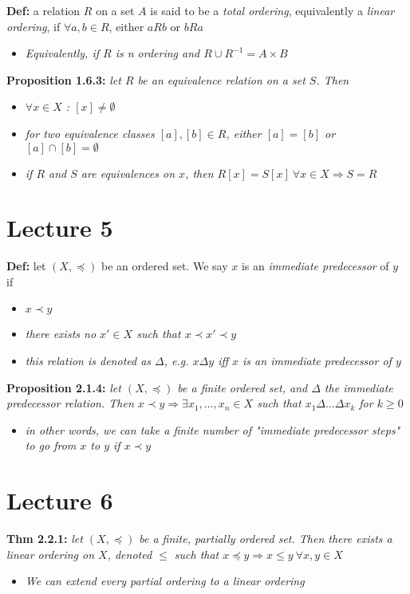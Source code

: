 \documentclass[12pt]{article}
\begin{document}
\textbf{Def: }a relation $R$ on a set $A$ is said to be a \emph{total ordering}, equivalently a \emph{linear ordering}, if $\forall a, b \in R$, either $aRb$ or $bRa$
\begin{itemize}
    \item \emph{Equivalently, if $R$ is n ordering and $R \cup R^{-1} = A \times B$}
\end{itemize}

\textbf{Proposition 1.6.3: }\emph{let $R$ be an equivalence relation on a set $S$. Then}
\begin{itemize}
    \item \emph{$\forall x \in X$ : $[x] \neq \emptyset$}
    \item \emph{for two equivalence classes $[a], [b] \in R$, either $[a] = [b]$ or $[a] \cap [b] = \emptyset$}
    \item \emph{if $R$ and $S$ are equivalences on $x$, then $R[x] = S[x]\ \forall x \in X \Rightarrow S = R$}
\end{itemize}
\clearpage

\section{Lecture 5}
\textbf{Def: }let $(X, \preceq)$ be an ordered set. We say $x$ is an \emph{immediate predecessor} of $y$ if
\begin{itemize}
    \item \emph{$x \prec y$}
    \item \emph{there exists no $x' \in X$ such that $x \prec x' \prec y$}
    \item \emph{this relation is denoted as $\Delta$, e.g. $x\Delta y$ iff $x$ is an immediate predecessor of $y$}
\end{itemize}

\textbf{Proposition 2.1.4: }\emph{let $(X, \preceq)$ be a finite ordered set, and $\Delta$ the immediate predecessor relation. Then $x \prec y \Rightarrow \exists x_1, \dots, x_n \in X$ such that $x_1 \Delta \dots \Delta x_k$ for $k \geq 0$}
\begin{itemize}
    \item \emph{in other words, we can take a finite number of "immediate predecessor steps" to go from $x$ to $y$ if $x \prec y$}
\end{itemize}
\clearpage

\section{Lecture 6}
\textbf{Thm 2.2.1: }\emph{let $(X, \preceq)$ be a finite, partially ordered set. Then there exists a linear ordering on $X$, denoted $\leq$ such that $x \preceq y \Rightarrow x \leq y\ \forall x, y \in X$}
\begin{itemize}
    \item \emph{We can extend every partial ordering to a linear ordering}
\end{itemize}
\end{document}
